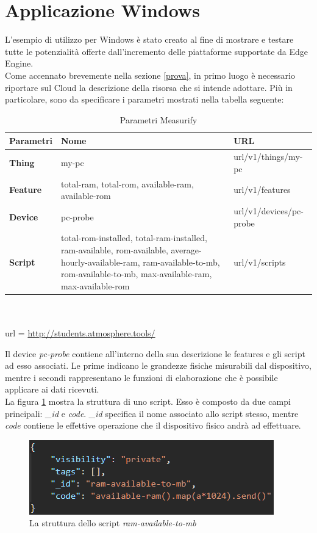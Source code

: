 \section{Applicazione Windows}
L'esempio di utilizzo per Windows è stato creato al fine di mostrare e testare tutte le potenzialità offerte dall'incremento delle piattaforme supportate da Edge Engine.\\
Come accennato brevemente nella sezione \ref{prova}, in primo luogo è necessario riportare sul Cloud la descrizione della risorsa che si intende adottare. Più in particolare, sono da specificare i parametri mostrati nella tabella seguente:
\begin{table}[H]
	\begin{tabular}{|p{}|p{}|p{}|}
		\hline
		\textbf{Parametri} & \textbf{Nome} & \textbf{URL}\\
		\hline
		\textbf{Thing} & my-pc & {{url}}/v1/things/my-pc\\
		\hline
		\textbf{Feature} & total-ram, total-rom, available-ram, available-rom & {{url}}/v1/features\\
		\hline
		\textbf{Device} & pc-probe & {{url}}/v1/devices/pc-probe\\	
		\hline
		\textbf{Script} & total-rom-installed, total-ram-installed, ram-available, rom-available, average-hourly-available-ram, ram-available-to-mb, rom-available-to-mb,  max-available-ram, max-available-rom & {{url}}/v1/scripts\\	
		\hline
	\end{tabular}
\\\\url = \url{http://students.atmosphere.tools/}
	\caption{Parametri Measurify}
	\label{paramMeas}
\end{table}
Il device \textit{pc-probe} contiene all'interno della sua descrizione le features e gli script ad esso associati. Le prime indicano le grandezze fisiche misurabili dal dispositivo, mentre i secondi rappresentano le funzioni di elaborazione che è possibile applicare ai dati ricevuti. \\
La figura \ref{script} mostra la struttura di uno script. Esso è composto da due campi principali: \textit{\_id} e \textit{code}.  \textit{\_id} specifica il nome associato allo script stesso, mentre  \textit{code} contiene le effettive operazione che il dispositivo fisico andrà ad effettuare. 
\begin{figure}[H]
	\centering
	\includegraphics[width=0.66\linewidth]{pics/script}
	\caption{La struttura dello script \textit{ram-available-to-mb}}
	\label{script}
\end{figure}
